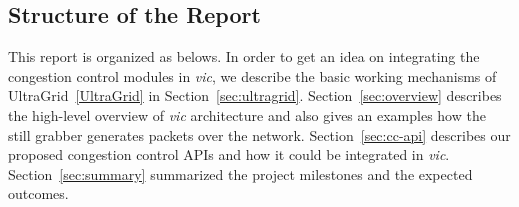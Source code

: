 \subsection{\label{ssec:structure}Structure of the Report}

This report is organized as belows. In order to get an idea on integrating the
congestion control modules in \emph{vic}, we describe the basic working
mechanisms of UltraGrid~\ref{UltraGrid} in Section~\ref{sec:ultragrid}.
Section~\ref{sec:overview} describes the high-level overview of \emph{vic}
architecture and also gives an examples how the still grabber generates packets
over the network. Section~\ref{sec:cc-api} describes our proposed congestion
control APIs and how it could be integrated in \emph{vic}.
Section~\ref{sec:summary} summarized the project milestones and the expected
outcomes.

\newpage

